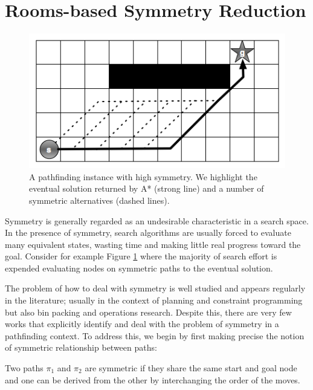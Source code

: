 \section{Rooms-based Symmetry Reduction}
\begin{figure}[]
       \begin{center}
                       \includegraphics[scale=0.40]{diagrams/symmetry_example.png}
       \end{center}
       \caption{A pathfinding instance with high symmetry. We highlight the
eventual solution returned by A* (strong line) and a number of symmetric 
alternatives (dashed lines).}
       \label{fig-symmetry}
		\vspace{-0.5em}
\end{figure}
Symmetry is generally regarded as an undesirable characteristic in a search
space.
In the presence of symmetry, search algorithms are usually forced to evaluate 
many equivalent states, wasting time and making little real progress toward the goal.
Consider for example Figure \ref{fig-symmetry} where the majority of search
effort is expended evaluating nodes on symmetric paths to the eventual solution.
\par
The problem of how to deal with symmetry is well studied and appears regularly
in the literature; usually in the context of planning and constraint programming
but also bin packing and operations research. 
Despite this, there are very few works that explicitly identify and deal with the 
problem of symmetry in a pathfinding context. To address this, we begin by first
making precise the notion of symmetric relationship between paths:
\begin{definition}
Two paths $\pi_{1}$ and $\pi_{2}$ are symmetric if they share the same start and
goal node and one can be derived from the other by interchanging the order of the
moves.
\end{definition}

